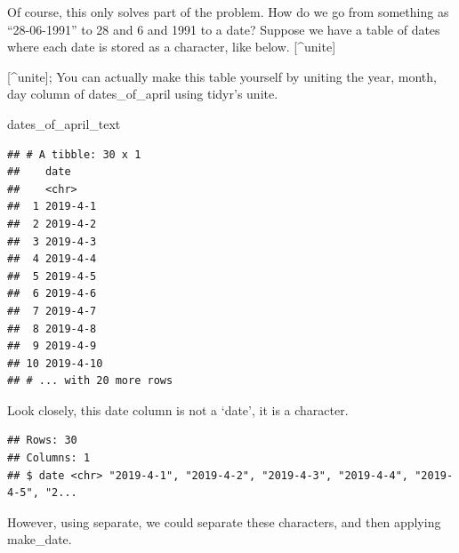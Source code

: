 \documentclass[]{tufte-book}
\newenvironment{Shaded}{}{}
\newcommand{\DataTypeTok}[1]{\textcolor[rgb]{0.56,0.13,0.00}{#1}}
\newcommand{\KeywordTok}[1]{\textcolor[rgb]{0.00,0.44,0.13}{\textbf{#1}}}
\newcommand{\NormalTok}[1]{#1}
\newcommand{\OperatorTok}[1]{\textcolor[rgb]{0.40,0.40,0.40}{#1}}
\newcommand{\StringTok}[1]{\textcolor[rgb]{0.25,0.44,0.63}{#1}}
\begin{document}
Of course, this only solves part of the problem. How do we go from something as ``28-06-1991'' to 28 and 6 and 1991 to a date? Suppose we have a table of dates where each date is stored as a character, like below. {[}\^{}unite{]}

{[}\^{}unite{]}; You can actually make this table yourself by uniting the year, month, day column of dates\_of\_april using tidyr's unite.

\begin{Shaded}
\begin{Highlighting}[]
\NormalTok{dates_of_april_text}
\end{Highlighting}
\end{Shaded}

\begin{verbatim}
## # A tibble: 30 x 1
##    date     
##    <chr>    
##  1 2019-4-1 
##  2 2019-4-2 
##  3 2019-4-3 
##  4 2019-4-4 
##  5 2019-4-5 
##  6 2019-4-6 
##  7 2019-4-7 
##  8 2019-4-8 
##  9 2019-4-9 
## 10 2019-4-10
## # ... with 20 more rows
\end{verbatim}

Look closely, this date column is not a `date', it is a character.

\begin{Shaded}
\end{Shaded}

\begin{verbatim}
## Rows: 30
## Columns: 1
## $ date <chr> "2019-4-1", "2019-4-2", "2019-4-3", "2019-4-4", "2019-4-5", "2...
\end{verbatim}

However, using separate, we could separate these characters, and then applying make\_date.

\begin{Shaded}
\end{Shaded}
\end{document}
